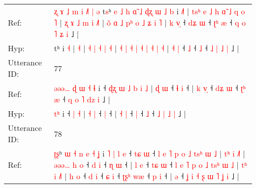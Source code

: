 \documentclass[10pt]{article}
\DeclareRobustCommand{\hl}[1]{{\textcolor{red}{#1}}}
\begin{document}
\begin{longtable}{ll}
Ref: & \hl{ʐ}\hl{ }\hl{ɤ}\hl{ }\hl{˩}\hl{ }\hl{m}\hl{ }\hl{i}\hl{ }\hl{˩}\hl{˥}\hl{ }\hl{|}\hl{ }\hl{ə}\hl{ }t\hl{s}ʰ\hl{ }\hl{e}\hl{ }\hl{˩}\hl{ }\hl{h}\hl{ }\hl{ɑ}\hl{̃}\hl{ }\hl{˩}\hl{ }\hl{ɖ}\hl{ʐ}\hl{ }\hl{ɯ}\hl{ }\hl{˩}\hl{ }\hl{b} i \hl{˩}\hl{˥} |\hl{ }\hl{t}\hl{s}\hl{ʰ}\hl{ }\hl{e}\hl{ }\hl{˩}\hl{ }\hl{h}\hl{ }\hl{ɑ}\hl{̃}\hl{ }\hl{˩}\hl{ }\hl{q}\hl{ }\hl{o} \hl{˥} |\hl{ }\hl{ʐ} \hl{ɤ} \hl{˩} \hl{m} \hl{i} \hl{˩}\hl{˥} | \hl{o}\hl{̃} \hl{ɑ} \hl{˩} \hl{p}\hl{ʰ} \hl{o} \hl{˩} \hl{ʑ} \hl{i} \hl{˥} | \hl{k} \hl{v}\hl{̩} ˧\hl{ }\hl{d}\hl{ʑ} \hl{ɯ} ˧\hl{ }\hl{ʈ}\hl{ʰ} \hl{æ} ˧\hl{ }\hl{q} \hl{o} \hl{˥} \hl{ʑ} \hl{i} ˩ |
 \\
Hyp: & \hl{}\hl{}\hl{}\hl{}\hl{}\hl{}\hl{}\hl{}\hl{}\hl{}\hl{}\hl{}\hl{}\hl{}\hl{}\hl{}\hl{}t\hl{}ʰ\hl{}\hl{}\hl{}\hl{}\hl{}\hl{}\hl{}\hl{}\hl{}\hl{}\hl{}\hl{}\hl{}\hl{}\hl{}\hl{}\hl{}\hl{}\hl{}\hl{} i \hl{}\hl{˧} |\hl{}\hl{}\hl{}\hl{}\hl{}\hl{}\hl{}\hl{}\hl{}\hl{}\hl{}\hl{}\hl{}\hl{}\hl{}\hl{}\hl{}\hl{}\hl{} \hl{˧} |\hl{}\hl{} \hl{˧} \hl{|} \hl{˧} \hl{|} \hl{}\hl{˧} | \hl{}\hl{˧} \hl{|} \hl{˧} \hl{}\hl{|} \hl{˧} \hl{|} \hl{˧} \hl{|} \hl{˧} | \hl{˧} \hl{}\hl{|} ˧\hl{}\hl{}\hl{} \hl{˩} ˧\hl{}\hl{}\hl{} \hl{˩} ˧\hl{}\hl{} \hl{˩} \hl{|} \hl{˩} \hl{|} ˩ |
 \\
\midrule
Utterance ID: & 77 \\
Ref: & \hl{ə}\hl{ə}\hl{ə}\hl{…}\hl{ }\hl{ɖ}\hl{ }\hl{ɯ}\hl{ }\hl{˧}\hl{ }\hl{ɬ} i ˧\hl{ }\hl{ɖ}\hl{ʐ}\hl{ }\hl{ɯ}\hl{ }\hl{˩}\hl{ }\hl{b} \hl{i} \hl{˩} | \hl{ɖ} \hl{ɯ} ˧\hl{ }\hl{ɬ} \hl{i} ˧ | \hl{k} \hl{v}\hl{̩} ˧\hl{ }\hl{d}\hl{ʑ} \hl{ɯ} ˧\hl{ }\hl{ʈ}\hl{ʰ} \hl{æ} ˧\hl{ }\hl{q} \hl{o} \hl{˥} \hl{d}\hl{z} \hl{i} ˩ |
 \\
Hyp: & \hl{}\hl{}\hl{}\hl{}\hl{}\hl{}\hl{}\hl{}\hl{}\hl{}\hl{t}\hl{ʰ} i ˧\hl{}\hl{}\hl{}\hl{}\hl{}\hl{}\hl{}\hl{}\hl{} \hl{|} \hl{˧} | \hl{˧} \hl{|} ˧\hl{}\hl{} \hl{|} ˧ | \hl{˧} \hl{}\hl{|} ˧\hl{}\hl{}\hl{} \hl{|} ˧\hl{}\hl{}\hl{} \hl{˩} ˧\hl{}\hl{} \hl{˩} \hl{|} \hl{}\hl{˩} \hl{|} ˩ |
 \\
\midrule
Utterance ID: & 78 \\
Ref: & \hl{ʈ}\hl{ʂ}ʰ\hl{ }\hl{ɯ}\hl{ }\hl{˧}\hl{ }\hl{n}\hl{ }\hl{e}\hl{ }\hl{˧}\hl{ }\hl{ʝ} i\hl{ }\hl{˥}\hl{ }\hl{|}\hl{ }\hl{l}\hl{ }\hl{e} ˧\hl{ }\hl{t}\hl{ɕ} \hl{ɯ} ˧\hl{ }\hl{l}\hl{ }\hl{e}\hl{ }\hl{˥}\hl{ }\hl{p}\hl{ }\hl{o}\hl{ }\hl{˩}\hl{ }\hl{t}\hl{s}\hl{ʰ}\hl{ }\hl{ɯ}\hl{ }\hl{˩} |\hl{ }\hl{t}\hl{ʰ}\hl{ }\hl{i} \hl{˩}\hl{˥} |\hl{ }\hl{ə}\hl{ə}\hl{ə}\hl{…}\hl{ }\hl{h}\hl{ }\hl{o} ˧\hl{ }\hl{d} \hl{i} ˧\hl{ }\hl{ɳ} \hl{ɯ} ˧ |\hl{ }\hl{l}\hl{ }\hl{e} ˧\hl{ }\hl{t}\hl{ɕ} \hl{ɯ} ˧\hl{ }\hl{l}\hl{ }\hl{e}\hl{ }\hl{˥}\hl{ }\hl{p}\hl{ }\hl{o}\hl{ }\hl{˩}\hl{ }\hl{t}\hl{s}\hl{ʰ}\hl{ }\hl{ɯ}\hl{ }\hl{˩} |\hl{ }\hl{t}\hl{ʰ}\hl{ }\hl{i} \hl{˩}\hl{˥} |\hl{ }\hl{h}\hl{ }\hl{o} ˧\hl{ }\hl{d} \hl{i} ˧\hl{ }\hl{ɕ} \hl{i} ˧\hl{ }\hl{ʈ}\hl{ʂ}\hl{ʰ} \hl{w}\hl{æ} ˧\hl{ }\hl{p} \hl{i} ˧ |\hl{ }\hl{ə} ˧ \hl{ʝ} \hl{i} \hl{˧} \hl{ʂ} \hl{ɯ} \hl{˥} \hl{ʝ} \hl{i} ˩ |

\end{longtable}
\end{document}
